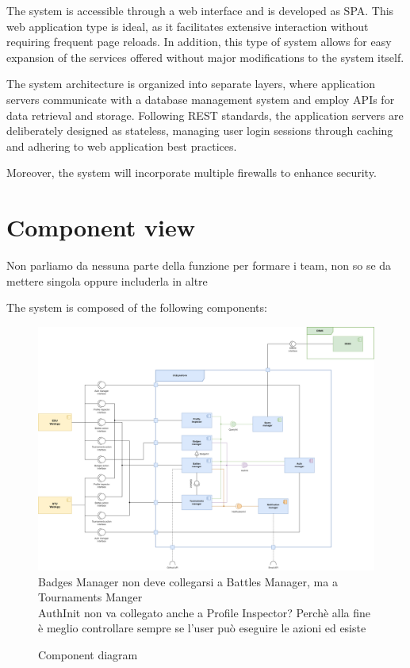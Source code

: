 The system is accessible through a web interface and is developed as SPA. 
This web application type is ideal, as it facilitates extensive interaction without requiring frequent page reloads. 
In addition, this type of system allows for easy expansion of the services offered without major modifications to the system itself. 

The system architecture is organized into separate layers, where application servers communicate with a database management system and employ APIs for data retrieval and storage. 
Following REST standards, the application servers are deliberately designed as stateless, managing user login sessions through caching and adhering to web application best practices. 

Moreover, the system will incorporate multiple firewalls to enhance security.

\section{Component view}
{\color{red} Non parliamo da nessuna parte della funzione per formare i team, non so se da mettere singola oppure includerla in altre \\}

The system is composed of the following components:

\begin{figure}[H]
    \centering
    \includegraphics[width=\textwidth]{images/diagrams/component_diagram.png}
    {\color{red}
        Badges Manager non deve collegarsi a Battles Manager, ma a Tournaments Manger \\
        AuthInit non va collegato anche a Profile Inspector? Perchè alla fine è meglio controllare sempre se l'user può eseguire le azioni ed esiste \\
    }
    \caption{Component diagram}
\end{figure}


